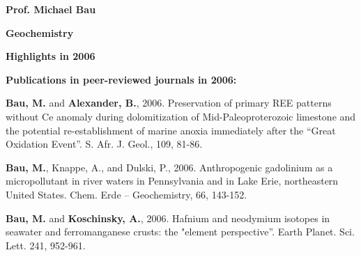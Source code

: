 \textbf{Prof. Michael Bau}

\textbf{}

\textbf{Geochemistry}



        







\textbf{Highlights in 2006}












\textbf{Publications in peer-reviewed journals in 2006:}



\textbf{Bau, M.} and \textbf{Alexander, B.}, 2006. Preservation of primary REE patterns without Ce anomaly during dolomitization of Mid-Paleoproterozoic limestone and the potential re-establishment of marine anoxia immediately after the ``Great Oxidation Event''. S. Afr. J. Geol., 109, 81-86.



\textbf{Bau, M.}, Knappe, A., and Dulski, P., 2006. Anthropogenic gadolinium as a micropollutant in river waters in Pennsylvania and in Lake Erie, northeastern United States. Chem. Erde -- Geochemistry, 66, 143-152.

 

\textbf{Bau, M.} and \textbf{Koschinsky, A.}, 2006. Hafnium and neodymium isotopes in seawater and ferromanganese crusts: the "element perspective''. Earth Planet. Sci. Lett. 241, 952-961.
